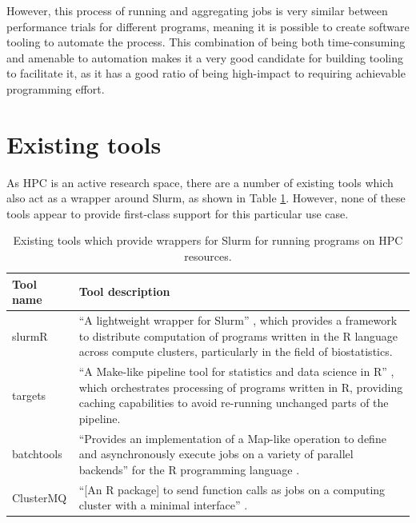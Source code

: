However, this process of running and aggregating jobs is very similar between performance trials for different programs, meaning it is possible to create software tooling to automate the process. This combination of being both time-consuming and amenable to automation makes it a very good candidate for building tooling to facilitate it, as it has a good ratio of being high-impact to requiring achievable programming effort.

\section{Existing tools}
\label{sec:hpc-multibench-existing-tools}

As \acrshort{HPC} is an active research space, there are a number of existing tools which also act as a wrapper around Slurm, as shown in Table \ref{tab:hpc-multibench-existing-tools}. However, none of these tools appear to provide first-class support for this particular use case.

\begin{table}[H]
    \caption{Existing tools which provide wrappers for Slurm for running programs on \acrshort{HPC} resources.}
    \label{tab:hpc-multibench-existing-tools}
    \begin{tabular}{|p{}|p{}|}
    \hline
    \textbf{Tool name}  & \textbf{Tool description} \\ \hline\hline
    slurmR \cite{USCbiostatsSlurmR2024} & ``A lightweight wrapper for Slurm'' \cite{gvegayonJournalOpenSource}, which provides a framework to distribute computation of programs written in the R language across compute clusters, particularly in the field of biostatistics. \\ \hline
    targets \cite{RopensciTargets2024} & ``A Make-like pipeline tool for statistics and data science in R'' \cite{landauTargetsPackageDynamic2021}, which orchestrates processing of programs written in R, providing caching capabilities to avoid re-running unchanged parts of the pipeline. \\ \hline
    batchtools \cite{langBatchtoolsToolsWork2017} & ``Provides an implementation of a Map-like operation to define and asynchronously execute jobs on a variety of parallel backends'' for the R programming language \cite{langBatchtoolsToolsWork2017}. \\ \hline
    ClusterMQ \cite{schubertMschubertClustermq2024} & ``[An R package] to send function calls as jobs on a computing cluster with a minimal interface'' \cite{schubertClustermqEnablesEfficient2019}. \\ \hline
    \end{tabular}
\end{table}

